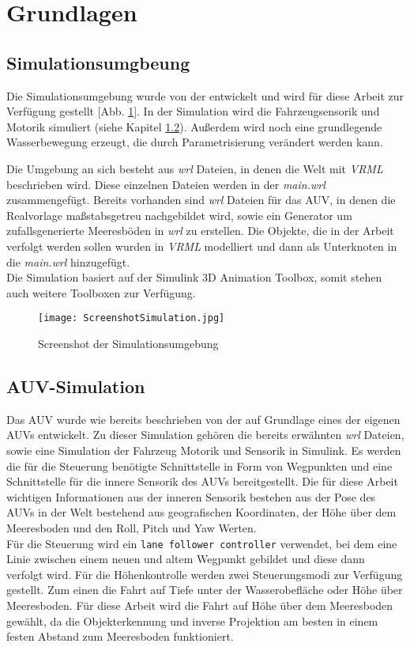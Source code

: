 \section{Grundlagen}
\subsection{Simulationsumgbeung}
Die Simulationsumgebung wurde von der \atlas entwickelt und wird für diese Arbeit zur Verfügung gestellt [Abb. \ref{screenSim}].
In der Simulation wird die Fahrzeugsensorik und Motorik simuliert (siehe Kapitel \ref{sec_auvSimGrundlage}). Außerdem wird noch eine grundlegende Wasserbewegung erzeugt, die durch Parametrisierung verändert werden kann.\\

Die Umgebung an sich besteht aus \textit{wrl} Dateien, in denen die Welt mit \textit{VRML} beschrieben wird. Diese einzelnen Dateien werden in der \textit{main.wrl} zusammengefügt. Bereits vorhanden sind \textit{wrl} Dateien für das AUV, in denen die Realvorlage maßstabsgetreu nachgebildet wird, sowie ein Generator um zufallsgenerierte Meeresböden in \textit{wrl} zu erstellen. Die Objekte, die in der Arbeit verfolgt werden sollen wurden in \textit{VRML} modelliert und dann als Unterknoten in die \textit{main.wrl} hinzugefügt.\\
Die Simulation basiert auf der \matlab Simulink 3D Animation Toolbox, somit stehen auch weitere \matlab Toolboxen zur Verfügung. 
\begin{figure}[H]
\texttt{[image: ScreenshotSimulation.jpg]}
\caption{Screenshot der Simulationsumgebung}
\label{screenSim}
\end{figure}
\subsection{AUV-Simulation}
\label{sec_auvSimGrundlage}
Das AUV wurde wie bereits beschrieben von der \atlas auf Grundlage eines der eigenen AUVs entwickelt. Zu dieser Simulation gehören die bereits erwähnten \textit{wrl} Dateien, sowie eine Simulation der Fahrzeug Motorik und Sensorik in \matlab Simulink. Es werden die für die Steuerung benötigte Schnittstelle in Form von Wegpunkten und eine Schnittstelle für die innere Sensorik des AUVs bereitgestellt. Die für diese Arbeit wichtigen Informationen aus der inneren Sensorik bestehen aus der Pose des AUVs in der Welt bestehend aus geografischen Koordinaten, der Höhe über dem Meeresboden und den Roll, Pitch und Yaw Werten.\\
Für die Steuerung wird ein \texttt{lane follower controller} verwendet, bei dem eine Linie zwischen einem neuen und altem Wegpunkt gebildet und diese dann verfolgt wird. Für die Höhenkontrolle werden zwei Steuerungsmodi zur Verfügung gestellt. Zum einen die Fahrt auf Tiefe unter der Wasserobefläche oder Höhe über Meeresboden. Für diese Arbeit wird die Fahrt auf Höhe über dem Meeresboden gewählt, da die Objekterkennung und inverse Projektion am besten in einem festen Abstand zum Meeresboden funktioniert.

